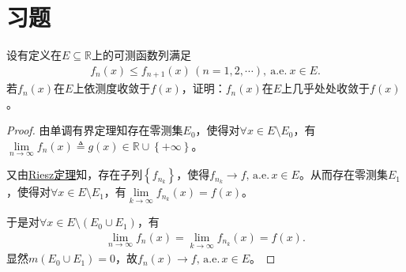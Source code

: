 \documentclass[../../main.tex]{subfiles}%
\begin{document}
\section{习题}

\begin{example}
设有定义在$E\subseteq \mathbb{R}$上的可测函数列满足
\begin{align*}
f_n(x)\leqslant f_{n+1}(x)\,(n=1,2,\cdots),\ \mathrm{a.e.}\ x\in E.
\end{align*}
若$f_n(x)$在$E$上依测度收敛于$f(x)$，证明：$f_n(x)$在$E$上几乎处处收敛于$f(x)$。
\end{example}
\begin{proof}

由单调有界定理知存在零测集$E_0$，使得对$\forall x\in E\setminus E_0$，有$\lim\limits_{n\to \infty}f_n\left(x\right)\triangleq g\left(x\right)\in \mathbb{R}\cup \left\{+\infty\right\}$。

又由\hyperref[theorem:Riesz定理]{Riesz定理}知，存在子列$\left\{f_{n_k}\right\}$，使得$f_{n_k}\to f,\,\mathrm{a.e.}\,x\in E$。从而存在零测集$E_1$，使得对$\forall x\in E\setminus E_1$，有$\lim\limits_{k\to \infty}f_{n_k}\left(x\right)=f\left(x\right)$。

于是对$\forall x\in E\setminus \left(E_0\cup E_1\right)$，有
\begin{align*}
\lim\limits_{n\to \infty}f_n\left(x\right)=\lim\limits_{k\to \infty}f_{n_k}\left(x\right)=f\left(x\right).
\end{align*}
显然$m\left(E_0\cup E_1\right)=0$，故$f_n\left(x\right)\to f,\,\mathrm{a.e.}\,x\in E$。
\end{proof}
\end{document}
